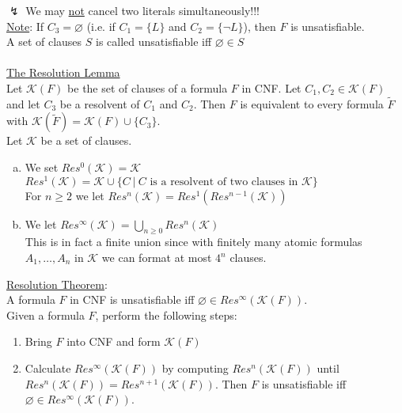 \documentclass[a4paper]{article}
\newcommand{\ul}{\underline}
\begin{document}
$\lightning$ We may \ul{not} cancel two literals simultaneously!!!\\
\ul{Note}: If $C_3=\varnothing$ (i.e. if $C_1=\{L\}$ and $C_2=\{\neg L\}$), then $F$ is unsatisfiable.\\
A set of clauses $S$ is called unsatisfiable iff $\varnothing\in S$\\\\
\ul{The Resolution Lemma}\\
Let $\mathcal{K}(F)$ be the set of clauses of a formula $F$ in CNF. Let $C_1,C_2\in\mathcal{K}(F)$ and let $C_3$ be a resolvent of $C_1$ and $C_2$. Then $F$ is equivalent to every formula $\tilde{F}$ with $\mathcal{K}(\tilde{F})=\mathcal{K}(F)\cup\{C_3\}$.\\
Let $\mathcal{K}$ be a set of clauses.
\begin{enumerate}[(a)]
	\item We set $Res^0(\mathcal{K})=\mathcal{K}$\\
	$Res^1(\mathcal{K})=\mathcal{K}\cup\{C\ \vert\ C\text{ is a resolvent of two clauses in }\mathcal{K}\}$\\
	For $n\geq 2$ we let $Res^n(\mathcal{K})=Res^1(Res^{n-1}(\mathcal{K}))$
	\item We let $Res^\infty(\mathcal{K})=\bigcup_{n\geq 0}Res^n(\mathcal{K})$\\
	This is in fact a finite union since with finitely many atomic formulas $A_1,\dots,A_n$ in $\mathcal{K}$ we can format at most $4^n$ clauses.
\end{enumerate}
\ul{Resolution Theorem}:\\
A formula $F$ in CNF is unsatisfiable iff $\varnothing\in Res^\infty(\mathcal{K}(F))$.\\
Given a formula $F$, perform the following steps:
\begin{enumerate}[(1)]
	\item Bring $F$ into CNF and form $\mathcal{K}(F)$
	\item Calculate $Res^\infty (\mathcal{K}(F))$ by computing $Res^n(\mathcal{K}(F))$ until $Res^n(\mathcal{K}(F))=Res^{n+1}(\mathcal{K}(F))$. Then $F$ is unsatisfiable iff $\varnothing\in Res^\infty (\mathcal{K}(F))$.
\end{enumerate}
\end{document}
